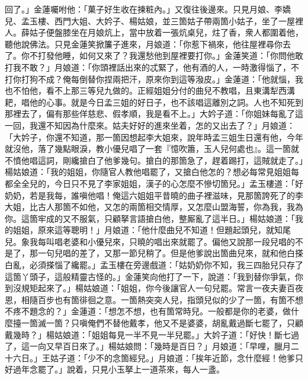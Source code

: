 回了。」金蓮囑咐他：「菓子好生收在揀粧內。」又復往後邊來。只見月娘、李嬌兒、孟玉樓、西門大姐、大妗子、楊姑娘，並三箇姑子帶兩箇小姑子，坐了一屋裡人。薛姑子便盤膝坐在月娘炕上，{}當中放着一張炕桌兒，炷了香，衆人都圍着他，聽他說佛法。只見金蓮笑掀簾子進來，{}月娘道：「你惹下禍來，他往屋裡尋你去了。你不打發他睡，如何又來了？我還愁他到屋裡要打你。」金蓮笑道：「你問他敢打我不敢？」{}月娘道：「你頭裡話出來的忒緊了，他有酒的人，一時激得惱了，不打你打狗不成？俺每倒替你捏兩把汗，原來你到這等潑皮。」金蓮道：「他就惱，我也不怕他，看不上那三等兒九做的。正經姐姐分付的曲兒不教唱，且東溝犁西溝耙，唱他的心事。就是今日孟三姐的好日子，也不該唱這離別之詞。{}人也不知死到那裡去了，偏有那些佯慈悲、假孝順，我是看不上。」大妗子道：「你姐妹每亂了這一回，我還不知因為什麼來。姑夫好好的進來坐着，怎的又出去了？」月娘道：「大妗子，你還不知道，那一箇因想起李大姐來，說年時孟三姐生日還有他，今年就沒他，落了幾點眼淚，教小優兒唱了一套『憶吹簫，玉人兒何處也』。這一箇就不憤他唱這詞，剛纔搶白了他爹幾句。搶白的那箇急了，趕着踢打，這賊就走了。」楊姑娘道：「我的姐姐，你隨官人教他唱罷了，又搶白他怎的？想必每常見姐姐每都全全兒的，今日只不見了李家姐姐，漢子的心怎麼不慘切箇兒。」孟玉樓道：「好奶奶，若是我每，誰嗔他唱！俺這六姐姐平昔曉的曲子裡滋味，見那箇誇死了的李大姐，比古人那箇不如他，又怎的兩箇相交情厚，又怎麼山盟海誓，你為我，我為你。這箇牢成的又不服氣，只顧拏言語搶白他，整厮亂了這半日。」楊姑娘道：「我的姐姐，原來這等聰明！」月娘道：「他什麼曲兒不知道！但題起頭兒，就知尾兒。象我每叫唱老婆和小優兒來，只曉的唱出來就罷了。偏他又說那一段兒唱的不是了，那一句兒唱的差了，又那一節兒稍了。但是他爹說出箇曲兒來，就和他白搽白亂，必須搽惱了纔罷。」孟玉樓在旁邊戲道：「姑奶奶你不知，我三四胎兒只存了這箇丫頭子，這般精靈古怪的。」金蓮笑向他打了一下，說道：「我到替你爭氣，你到沒規矩起來了。」楊姑娘道：「姐姐，你今後讓官人一句兒罷。常言一夜夫妻百夜恩，相隨百步也有箇徘徊之意。一箇熱突突人兒，指頭兒似的少了一箇，{}有箇不想不疼不題念的？」金蓮道：「想怎不想，也有箇常時兒。一般都是你的老婆，做什麼擡一箇滅一箇？只嗔俺們不替他戴孝，他又不是婆婆，胡亂戴過斷七罷了，{}只顧戴幾時？」楊姑娘道：「姐姐每見一半不見一半兒罷。」大妗子道：「好快！斷七過了，這一向又早百日來了。」{}楊姑娘問：「幾時是百日？」月娘道：「早哩，臘月二十六日。」王姑子道：「少不的念箇經兒。」{}月娘道：「挨年近節，念什麼經！他爹只好過年念罷了。」說着，只見小玉拏上一道茶來，每人一盞。

